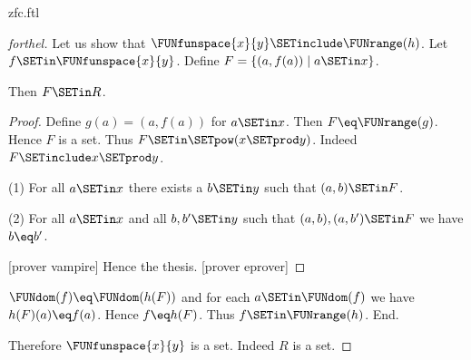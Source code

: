 \documentclass{naproche-library}
\begin{document}
\begin{smodule}[title=ZFC]{zfc.ftl}
\begin{proof}[forthel]
  Let us show that $\FUNfunspace{x}{y} \SETinclude \FUNrange(h)$.
    Let $f \SETin \FUNfunspace{x}{y}$.
    Define $F = \{ (a,f(a)) \mid a \SETin x \}$.

    Then $F \SETin R$.
    \begin{proof}
      Define $g(a) = (a,f(a))$ for $a \SETin x$.
      Then $F \eq \FUNrange(g)$.
      Hence $F$ is a set.
      Thus $F \SETin \SETpow(x \SETprod y)$.
      Indeed $F \SETinclude x \SETprod y$.

      (1) For all $a \SETin x$ there exists a $b \SETin y$ such that $(a,b) \SETin F$.

      (2) For all $a \SETin x$ and all $b, b' \SETin y$ such that $(a,b),
      (a,b') \SETin F$ we have $b \eq b'$.

      [prover vampire]
      Hence the thesis.
      [prover eprover]
    \end{proof}

    $\FUNdom(f) \eq \FUNdom(h(F))$ and for each $a \SETin \FUNdom(f)$ we have $h(F)(a) \eq f(a)$.
    Hence $f \eq h(F)$.
    Thus $f \SETin \FUNrange(h)$.
  End.

  Therefore $\FUNfunspace{x}{y}$ is a set.
  Indeed $R$ is a set.
\end{proof}
\end{smodule}
\end{document}
